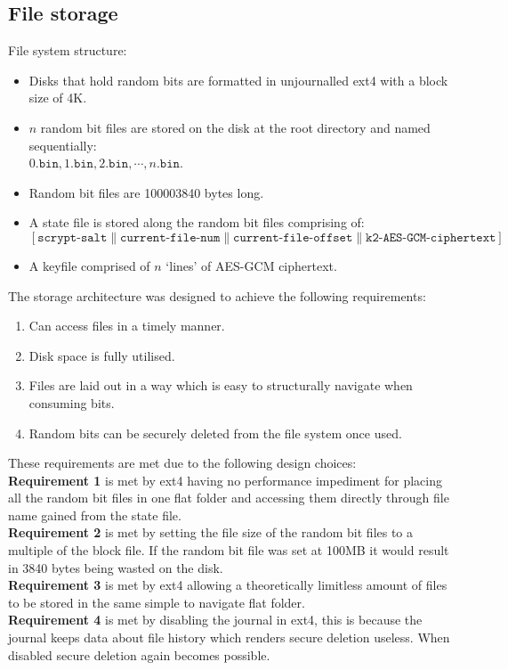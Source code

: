 \documentclass{paper}
\begin{document}
			\subsection{File storage}
				File system structure: \vspace{-0.75em}
				\begin{itemize}
				\setlength\itemsep{-0.3em}
				\item Disks that hold random bits are formatted in unjournalled ext4 with a block size of 4K.
				\item $n$ random bit files are stored on the disk at the root directory and named sequentially:\\
				$0.\texttt{bin}, 1.\texttt{bin}, 2.\texttt{bin}, \cdots , n.\texttt{bin}$.
				\item Random bit files are 100003840 bytes long.
				\item A state file is stored along the random bit files comprising of:\\ $\left[ \texttt{scrypt-salt}\parallel\texttt{current-file-num}\parallel\texttt{current-file-offset}\parallel\texttt{k2-AES-GCM-ciphertext}\right]$ 
				\item A keyfile comprised of $n$ `lines' of AES-GCM ciphertext.
				\end{itemize}
				The storage architecture was designed to achieve the following requirements: \vspace{-0.75em}
				\begin{enumerate}
				\setlength\itemsep{-0.3em}
				\item 	Can access files in a timely manner.
				\item 	Disk space is fully utilised.
				\item 	Files are laid out in a way which is easy to structurally navigate when consuming bits.
				\item 	Random bits can be securely deleted from the file system once used.
				\end{enumerate}
				These requirements are met due to the following design choices:\\
				\textbf{Requirement 1} is met by ext4 having no performance impediment for placing all the random bit files in one flat folder and accessing them directly through file name gained from the state file.\\
				\textbf{Requirement 2} is met by setting the file size of the random bit files to a multiple of the block file. If the random bit file was set at 100MB it would result in 3840 bytes being wasted on the disk.\\
				\textbf{Requirement 3} is met by ext4 allowing a theoretically limitless amount of files to be stored in the same simple to navigate flat folder.\\
				\textbf{Requirement 4} is met by disabling the journal in ext4, this is because the journal keeps data about file history which renders secure deletion useless. When disabled secure deletion again becomes possible.
				
\end{document}
